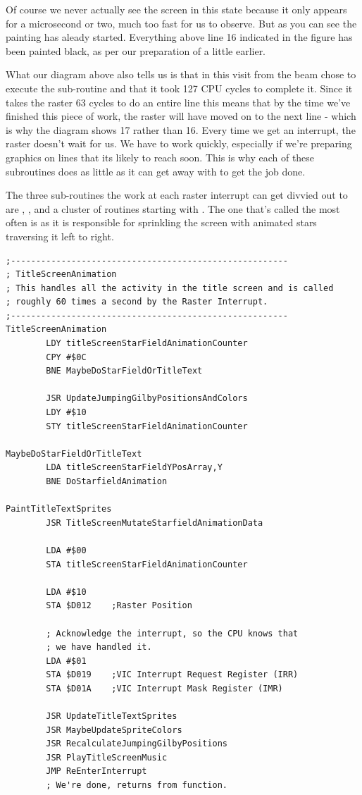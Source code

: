 Of course we never actually see the screen in this state because it only appears for a microsecond or two, much too
fast for us to observe. But as you can see the painting has aleady started. Everything above line 16 indicated in 
the figure has been painted black, as per our preparation of  a little earlier.

What our diagram above also tells us is that in this visit from the beam  chose to execute
the sub-routine  and that it took 127 CPU cycles to complete it. Since it takes the
raster 63 cycles to do an entire line this means that by the time we've finished this piece of work, the raster will have
moved on to the next line - which is why the diagram shows 17 rather than 16. Every time we get an interrupt, the 
raster doesn't wait for us. We have to work quickly, especially if we're preparing graphics on lines that its likely
to reach soon. This is why each of these subroutines does as little as it can get away with to get the job done.

The three sub-routines the work at each raster interrupt can get divvied out to are ,
, and a cluster of routines starting with . The one
that's called the most often is  as it is responsible for sprinkling the screen with 
animated stars traversing it left to right.

\begin{lstlisting}[caption=\icode{TitleScreenAnimation} responsible for choosing what to do at each interrupt. ]
;-------------------------------------------------------
; TitleScreenAnimation
; This handles all the activity in the title screen and is called
; roughly 60 times a second by the Raster Interrupt.
;-------------------------------------------------------
TitleScreenAnimation
        LDY titleScreenStarFieldAnimationCounter
        CPY #$0C
        BNE MaybeDoStarFieldOrTitleText

        JSR UpdateJumpingGilbyPositionsAndColors
        LDY #$10
        STY titleScreenStarFieldAnimationCounter

MaybeDoStarFieldOrTitleText   
        LDA titleScreenStarFieldYPosArray,Y
        BNE DoStarfieldAnimation

PaintTitleTextSprites
        JSR TitleScreenMutateStarfieldAnimationData

        LDA #$00
        STA titleScreenStarFieldAnimationCounter

        LDA #$10
        STA $D012    ;Raster Position

        ; Acknowledge the interrupt, so the CPU knows that
        ; we have handled it.
        LDA #$01
        STA $D019    ;VIC Interrupt Request Register (IRR)
        STA $D01A    ;VIC Interrupt Mask Register (IMR)

        JSR UpdateTitleTextSprites
        JSR MaybeUpdateSpriteColors
        JSR RecalculateJumpingGilbyPositions
        JSR PlayTitleScreenMusic
        JMP ReEnterInterrupt
        ; We're done, returns from function.
\end{lstlisting}

